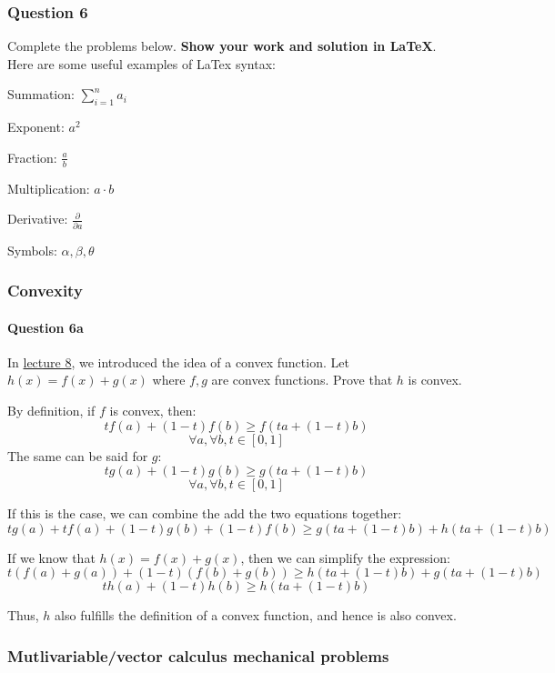 \documentclass[11pt]{article}
\begin{document}
\subsubsection{Question 6}\label{question-6}

Complete the problems below. \textbf{Show your work and solution in
LaTeX}. Here are some useful examples of LaTex syntax:

Summation: \(\sum_{i=1}^n a_i\)

Exponent: \(a^2\)

Fraction: \(\frac{a}{b}\)

Multiplication: \(a \cdot b\)

Derivative: \(\frac{\partial}{\partial a}\)

Symbols: \(\alpha, \beta, \theta\)

    \subsubsection{Convexity}\label{convexity}

\paragraph{Question 6a}\label{question-6a}

In \href{http://www.ds100.org/fa18/syllabus\#lecture-week-5}{lecture 8},
we introduced the idea of a convex function. Let \(h(x) = f(x) + g(x)\)
where \(f,g\) are convex functions. Prove that \(h\) is convex.

    By definition, if \(f\) is convex, then:
\[tf(a) + (1-t)f(b) \ge f(ta + (1-t)b)\]
\[\forall a, \forall b, t \in [0,1]\] The same can be said for \(g\):
\[tg(a) + (1-t)g(b) \ge g(ta + (1-t)b)\]
\[\forall a, \forall b, t \in [0,1]\]

If this is the case, we can combine the add the two equations together:
\[tg(a) + tf(a) + (1-t)g(b) + (1-t)f(b) \ge g(ta + (1-t)b) + h(ta + (1-t)b)\]

If we know that \(h(x) = f(x) + g(x)\), then we can simplify the
expression:
\[t(f(a) + g(a)) + (1-t)(f(b) + g(b)) \ge h(ta + (1-t)b) + g(ta + (1-t)b)\]
\[th(a) + (1-t)h(b) \ge h(ta + (1-t)b)\]

Thus, \(h\) also fulfills the definition of a convex function, and hence
is also convex.

    \subsubsection{Mutlivariable/vector calculus mechanical
problems}\label{mutlivariablevector-calculus-mechanical-problems}
\end{document}
